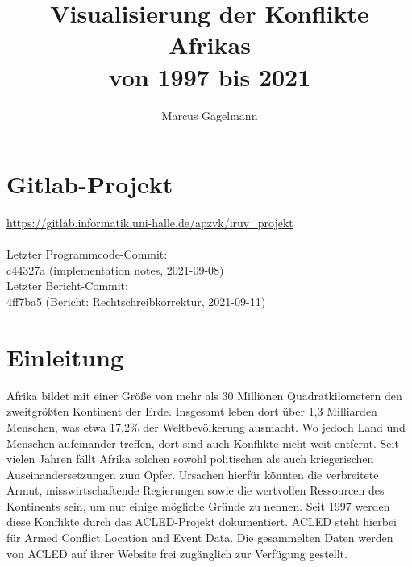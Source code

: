 \documentclass[usegeometry=true]{scrartcl}
\begin{document}
\subject{Projektbericht zum Modul Information Retrieval und Visualisierung Sommersemester 2021}
\title{Visualisierung der Konflikte Afrikas\\ von 1997 bis 2021}
\author{Marcus Gagelmann}%
\maketitle%

\section*{Gitlab-Projekt}
\url{https://gitlab.informatik.uni-halle.de/apzvk/iruv_projekt}\\\\
Letzter Programmcode-Commit:\\
\hspace*{10mm} c44327a (implementation notes, 2021-09-08)\\
Letzter Bericht-Commit:\\
\hspace*{10mm} 4ff7ba5 (Bericht: Rechtschreibkorrektur, 2021-09-11)\\

\section{Einleitung}
Afrika bildet mit einer Größe von mehr als 30 Millionen Quadratkilometern den zweitgrößten Kontinent der Erde. Insgesamt leben dort über 1,3 Milliarden Menschen, was etwa 17,2\% der Weltbevölkerung ausmacht. Wo jedoch Land und Menschen aufeinander treffen, dort sind auch Konflikte nicht weit entfernt. Seit vielen Jahren fällt Afrika solchen sowohl politischen als auch kriegerischen Auseinandersetzungen zum Opfer. Ursachen hierfür könnten die verbreitete Armut, misswirtschaftende Regierungen sowie die wertvollen Ressourcen des Kontinents sein, um nur einige mögliche Gründe zu nennen. Seit 1997 werden diese Konflikte durch das ACLED-Projekt dokumentiert. ACLED steht hierbei für \glqq Armed Conflict Location and Event Data\grqq{}. Die gesammelten Daten werden von ACLED auf ihrer Website \cite{acled} frei zugänglich zur Verfügung gestellt.\\
\end{document}
